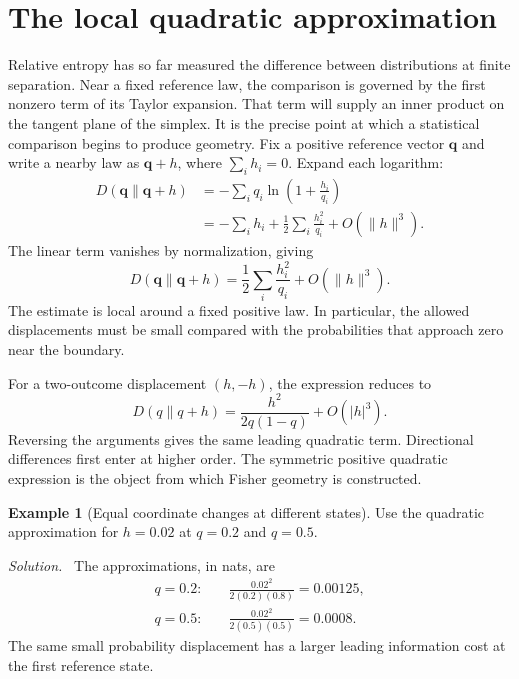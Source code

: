 \documentclass[11pt,oneside,openany]{book}
\theoremstyle{definition}
\newtheorem{example}{Example}[chapter]
\theoremstyle{remark}
\newenvironment{solution}{\par\smallskip\noindent\textit{Solution.}\ }{\par\smallskip}
\newcommand{\q}{\mathbf{q}}
\numberwithin{equation}{chapter}
\begin{document}
\section{The local quadratic approximation}
Relative entropy has so far measured the difference between distributions at finite separation. Near a fixed reference law, the comparison is governed by the first nonzero term of its Taylor expansion. That term will supply an inner product on the tangent plane of the simplex. It is the precise point at which a statistical comparison begins to produce geometry.
Fix a positive reference vector $\q$ and write a nearby law as $\q+h$, where $\sum_i h_i=0$. Expand each logarithm:
\begin{align*}
D(\q\|\q+h)
&=-\sum_iq_i\ln\left(1+\frac{h_i}{q_i}\right)\\
&=-\sum_i h_i+\frac12\sum_i\frac{h_i^2}{q_i}+O(\|h\|^3).
\end{align*}
The linear term vanishes by normalization, giving
\begin{equation}\label{eq:klquadratic}
\boxed{D(\q\|\q+h)=\frac12\sum_i\frac{h_i^2}{q_i}+O(\|h\|^3).}
\end{equation}
The estimate is local around a fixed positive law. In particular, the allowed displacements must be small compared with the probabilities that approach zero near the boundary.

For a two-outcome displacement $(h,-h)$, the expression reduces to
\begin{equation}\label{eq:binaryklquadratic}
D(q\|q+h)=\frac{h^2}{2q(1-q)}+O(|h|^3).
\end{equation}
Reversing the arguments gives the same leading quadratic term. Directional differences first enter at higher order. The symmetric positive quadratic expression is the object from which Fisher geometry is constructed.

\begin{example}[Equal coordinate changes at different states]
Use the quadratic approximation for $h=0.02$ at $q=0.2$ and $q=0.5$.
\begin{solution}
The approximations, in nats, are
\begin{align*}
q=0.2:&\quad \frac{0.02^2}{2(0.2)(0.8)}=0.00125,\\
q=0.5:&\quad \frac{0.02^2}{2(0.5)(0.5)}=0.0008.
\end{align*}
The same small probability displacement has a larger leading information cost at the first reference state.
\end{solution}
\end{example}
\end{document}
